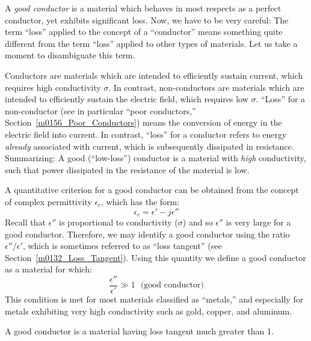 

\label{m0157_Good_Conductors} %

A \emph{good conductor} is a material which behaves in most respects as a perfect conductor, 
yet exhibits significant loss.
Now, we have to be very careful: The term ``loss'' applied to the concept of a ``conductor'' means something quite different from the term ``loss'' applied to other types of materials.
Let us take a moment to disambiguate this term.

Conductors are materials which are intended to efficiently sustain current, which requires high conductivity $\sigma$.
In contrast, non-conductors are materials which are intended to efficiently sustain the electric field, which requires low $\sigma$. 
``Loss'' for a non-conductor (see in particular ``poor conductors,'' Section~\ref{m0156_Poor_Conductors}) means the conversion of energy in the electric field into current. 
In contrast, ``loss'' for a conductor refers to energy \emph{already} associated with current, which is subsequently dissipated in resistance.
Summarizing: A good (``low-loss'') conductor is a material with \emph{high} conductivity, such that power dissipated in the resistance of the material is low.

A quantitative criterion for a good conductor can be obtained from the concept of complex permittivity $\epsilon_c$, which has the form:
%
\begin{equation}
\epsilon_c = \epsilon' - j\epsilon''
\end{equation}
%
Recall that $\epsilon''$ is proportional to conductivity ($\sigma$) and so $\epsilon''$ is very large for a good conductor.
Therefore, we may identify a good conductor using the ratio $\epsilon''/\epsilon'$, which is sometimes referred to as ``loss tangent''
(see Section~\ref{m0132_Loss_Tangent}).
Using this quantity we define a good conductor as a material for which:
%
\begin{equation}
\frac{\epsilon''}{\epsilon'} \gg 1 ~~~ \mbox{(good conductor)}
\label{m0157_eDef}
\end{equation}
%
This condition is met for most materials classified as ``metals,'' and especially for metals exhibiting very high conductivity such as gold, 
copper, 
and aluminum.
%
\begin{mdframed}[backgroundcolor=yellow!20,nobreak=true] 
A good conductor is a material having loss tangent much greater than 1.    
\end{mdframed}

